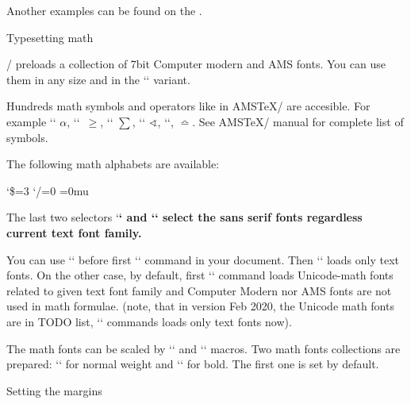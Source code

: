 {\begtt
\def\printbib{\hangindent=\parindent \indent \llap{\the\bibnum. }}
\def\printbib{\hangindent=\parindent \noindent [\the\bibmark]\quad}
\endtt 

Another examples can be found on the 
.


\sec Typesetting math

\OpTeX/ preloads a collection of 7bit Computer modern and AMS fonts.
You can use them in any size and in the `\boldmath` variant.

Hundreds math symbols and operators like in AMS\TeX/ are accesible. 
For example  `\alpha` $\alpha$, `\geq`~$\geq$, `\sum` $\sum$, 
`\sphericalangle` $\sphericalangle$, `\bumpeq`, $\bumpeq$. See AMS\TeX/
manual for complete list of symbols.

The following math alphabets are available:

\begtt    \catcode`\$=3 \catcode`/=0 \medmuskip=0mu \adef{ }{ }
\mit     %
\it      %
\rm      %
\cal     %
\script  %
\frak    %
\bbchar  %
\bf      %
\bi      %
\endtt

The last two selectors `\bf` and `\bi` select the sans serif fonts regardless
current text font family. 

You can use `\noloadmath` before first `\fontfam` command in your document.
Then `\fontfam` loads only text fonts. On the other case, by default, first
`\fontfam` command loads Unicode-math fonts related to given text font
family and Computer Modern nor AMS fonts are not used in math formulae.
(note, that in version Feb 2020, the Unicode math fonts are in TODO list,
`\fontfam` commands loads only text fonts now).

The math fonts can be scaled by `\typosize` and `\typoscale` macros.
Two math fonts collections are prepared: `\normalmath` for normal weight
and `\boldmath` for bold. The first one is set by default.


\sec Setting the margins

}
